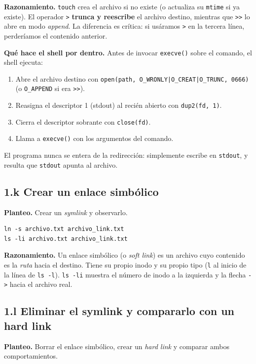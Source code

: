 \documentclass[11pt,a4paper]{article}
\begin{document}
\textbf{Razonamiento.} \texttt{touch} crea el archivo si no existe (o
actualiza su \texttt{mtime} si ya existe). El operador \texttt{>}
\textbf{trunca y reescribe} el archivo destino, mientras que
\texttt{>>} lo abre en modo \emph{append}. La diferencia es crítica:
si usáramos \texttt{>} en la tercera línea, perderíamos el contenido
anterior.

\textbf{Qué hace el shell por dentro.} Antes de invocar
\texttt{execve()} sobre el comando, el shell ejecuta:
\begin{enumerate}[leftmargin=*, itemsep=0pt]
    \item Abre el archivo destino con
        \texttt{open(path, O\_WRONLY|O\_CREAT|O\_TRUNC, 0666)}
        (o \texttt{O\_APPEND} si era \texttt{>>}).
    \item Reasigna el descriptor 1 (stdout) al recién abierto con
        \texttt{dup2(fd, 1)}.
    \item Cierra el descriptor sobrante con \texttt{close(fd)}.
    \item Llama a \texttt{execve()} con los argumentos del comando.
\end{enumerate}
El programa nunca se entera de la redirección: simplemente escribe en
\texttt{stdout}, y resulta que \texttt{stdout} apunta al archivo.

\subsection*{1.k Crear un enlace simbólico}

\textbf{Planteo.} Crear un \emph{symlink} y observarlo.

\begin{lstlisting}
ln -s archivo.txt archivo_link.txt
ls -li archivo.txt archivo_link.txt
\end{lstlisting}

\textbf{Razonamiento.} Un enlace simbólico (o \emph{soft link}) es un
archivo cuyo contenido es la \emph{ruta} hacia el destino. Tiene su
propio inodo y su propio tipo (\texttt{l} al inicio de la línea de
\texttt{ls -l}). \texttt{ls -li} muestra el número de inodo a la
izquierda y la flecha \texttt{->} hacia el archivo real.

\subsection*{1.l Eliminar el symlink y compararlo con un hard link}

\textbf{Planteo.} Borrar el enlace simbólico, crear un \emph{hard
link} y comparar ambos comportamientos.
\end{document}
